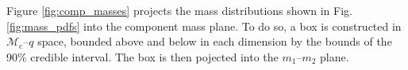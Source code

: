 Figure \ref{fig:comp_masses} projects the mass distributions shown in Fig. \ref{fig:mass_pdfs} into the component mass plane.  To do so, a box is constructed in $\mathcal{M}_\mathrm{c}$--$q$ space, bounded above and below in each dimension by the bounds of the 90\% credible interval.  The box is then pojected into the $m_1$--$m_2$ plane.